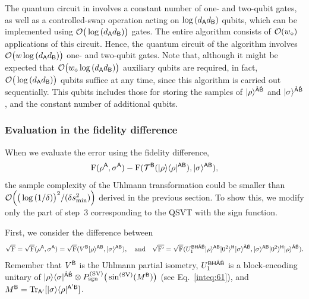 The quantum circuit in  involves a constant number of one- and two-qubit gates, as well as a controlled-swap operation acting on $\log{(d_{\mathsf{A}}d_{\mathsf{B}})}$ qubits, which can be implemented using ${\mathcal{O}}\big(\log{(d_{\mathsf{A}}d_{\mathsf{B}})}\big)$ gates. The entire algorithm consists of ${\mathcal{O}}(w_\diamond)$ applications of this circuit.
Hence, the quantum circuit of the algorithm involves ${\mathcal{O}}\big(w\log{(d_{\mathsf{A}}d_{\mathsf{B}})}\big)$ one- and two-qubit gates.
Note that, although it might be expected that ${\mathcal{O}}\big(w_\diamond\log{(d_{\mathsf{A}}d_{\mathsf{B}})}\big)$ auxiliary qubits are required, in fact, ${\mathcal{O}}\big(\log{(d_{\mathsf{A}}d_{\mathsf{B}})}\big)$ qubits suffice at any time, since this algorithm is carried out sequentially.
This qubits includes those for storing the samples of $|\rho\rangle^{\hat{{\mathsf{A}}}\hat{{\mathsf{B}}}}$ and $|\sigma\rangle^{\hat{{\mathsf{A}}}\hat{{\mathsf{B}}}}$, and the constant number of additional qubits.

















\subsubsection{Evaluation in the fidelity difference}
\label{sec:uhlfidpurifsamp}


When we evaluate the error using the fidelity difference, 
\begin{align}
    {\mathrm{F}}(\rho^{\mathsf{A}}, \sigma^{\mathsf{A}}) - {\mathrm{F}}({\mathcal{T}}^{\mathsf{B}}(|\rho\rangle\langle\rho|^{{\mathsf{A}}{\mathsf{B}}}), |\sigma\rangle^{{\mathsf{A}}{\mathsf{B}}}),
\end{align}
the sample complexity of the Uhlmann transformation could be smaller than ${\mathcal{O}}\Big(\big(\log{(1/\delta)}\big)^2/(\delta s_{\rm min}^2)\Big)$ derived in the previous section.
To show this, we modify only the part of step~3 corresponding to the QSVT with the sign function.




First, we consider the difference between 
\begin{align}
    \sqrt{\rF} 
    = \sqrt{\rF}(\rho^\sA, \sigma^\sA)
    = \sqrt{\rF}(V^\sB\ket{\rho}^{\sA\sB}, \ket{\sigma}^{\sA\sB}), \ \ \ \textrm{and} \ \ \ 
    \sqrt{\rF'} 
    = \sqrt{\rF}(U_1^{\sB\sH\hat{\sA}\hat{\sB}}\ket{\rho}^{\sA\sB}\ket{0^2}^\sH\ket{\sigma}^{\hat{\sA}\hat{\sB}}, \ket{\sigma}^{\sA\sB}\ket{0^2}^\sH\ket{\rho}^{\hat{\sA}\hat{\sB}}).
\end{align}
Remember that $V^{\mathsf{B}}$ is the Uhlmann partial isometry, $U_1^{{\mathsf{B}}{\mathsf{H}}\hat{{\mathsf{A}}}\hat{{\mathsf{B}}}}$ is a block-encoding unitary of $|\rho\rangle\langle\sigma|^{\hat{{\mathsf{A}}}\hat{{\mathsf{B}}}} \otimes P_{\mathrm{sgn}}^{(\rm SV)}\big(\sin^{(\rm SV)}(M^{\mathsf{B}})\big)$ (see Eq.~\eqref{inteq:61}), and $M^{\mathsf{B}} = \operatorname{Tr}_{{\mathsf{A}}'}[|\sigma\rangle\langle\rho|^{{\mathsf{A}}'{\mathsf{B}}}]$.


